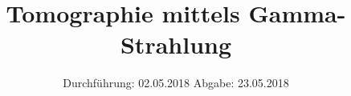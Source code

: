 

\subject{VERSUCH NUMMER 14}
\title{Tomographie mittels Gamma-Strahlung}
\date{
  Durchführung: 02.05.2018
  \hspace{3em}
  Abgabe: 23.05.2018
}



\thispagestyle{empty}
\maketitle
\thispagestyle{empty}
\tableofcontents
\newpage
\setcounter{page}{1}


% 




\nocite{*}
\printbibliography


